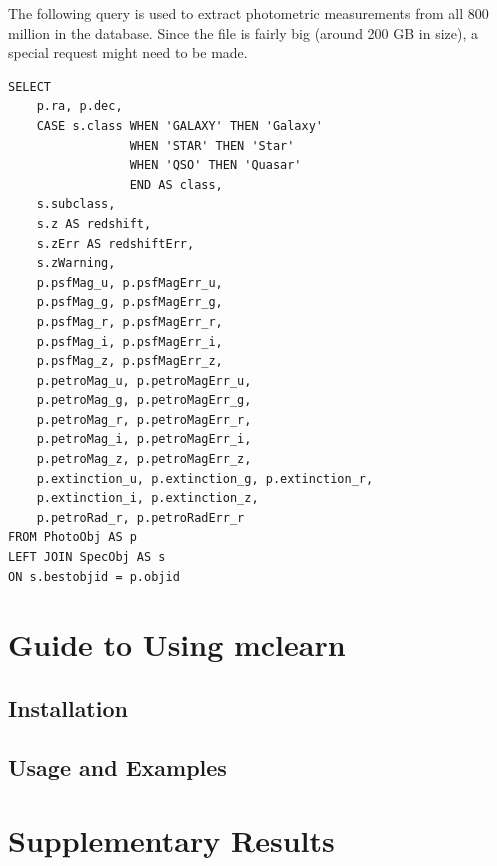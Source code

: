 The following query is used to extract photometric measurements from all 800 million
in the database. Since the file is fairly big (around 200 GB in size),
a special request might need to be made.

\begin{verbatim}
SELECT
	p.ra, p.dec,
	CASE s.class WHEN 'GALAXY' THEN 'Galaxy'
				 WHEN 'STAR' THEN 'Star'
				 WHEN 'QSO' THEN 'Quasar'
				 END AS class,
	s.subclass,
	s.z AS redshift,
	s.zErr AS redshiftErr,
	s.zWarning,
	p.psfMag_u, p.psfMagErr_u,
	p.psfMag_g, p.psfMagErr_g,
	p.psfMag_r, p.psfMagErr_r,
	p.psfMag_i, p.psfMagErr_i,
	p.psfMag_z, p.psfMagErr_z,
	p.petroMag_u, p.petroMagErr_u,
	p.petroMag_g, p.petroMagErr_g,
	p.petroMag_r, p.petroMagErr_r,
	p.petroMag_i, p.petroMagErr_i,
	p.petroMag_z, p.petroMagErr_z,
	p.extinction_u, p.extinction_g, p.extinction_r,
	p.extinction_i, p.extinction_z,
	p.petroRad_r, p.petroRadErr_r
FROM PhotoObj AS p
LEFT JOIN SpecObj AS s
ON s.bestobjid = p.objid
\end{verbatim}






\chapter{Guide to Using mclearn}
\label{cha:mclearn}

\section{Installation}
\label{sec:installation}

\section{Usage and Examples}
\label{sec:usage}





\chapter{Supplementary Results}
\label{cha:supp}

